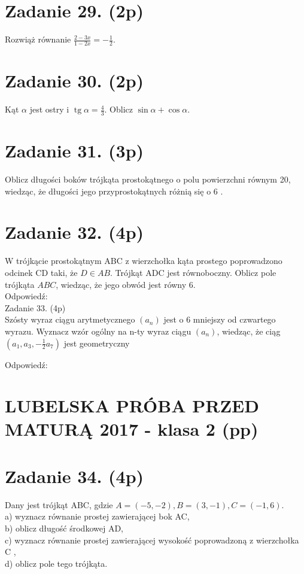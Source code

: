 \documentclass[10pt]{article}
\begin{document}
\section*{Zadanie 29. (2p)}
Rozwiąż równanie \(\frac{2-3 x}{1-2 x}=-\frac{1}{2}\).

\section*{Zadanie 30. (2p)}
Kąt \(\alpha\) jest ostry i \(\operatorname{tg} \alpha=\frac{4}{3}\). Oblicz \(\sin \alpha+\cos \alpha\).

\section*{Zadanie 31. (3p)}
Oblicz długości boków trójkąta prostokątnego o polu powierzchni równym 20, wiedząc, że długości jego przyprostokątnych różnią się o 6 .

\section*{Zadanie 32. (4p)}
W trójkącie prostokątnym ABC z wierzchołka kąta prostego poprowadzono odcinek CD taki, że \(D \in A B\). Trójkąt ADC jest równoboczny. Oblicz pole trójkąta \(A B C\), wiedząc, że jego obwód jest równy 6.\\
\(\qquad\)\\
Odpowiedź:\\
Zadanie 33. (4p)\\
Szósty wyraz ciągu arytmetycznego \(\left(a_{n}\right)\) jest o 6 mniejszy od czwartego wyrazu. Wyznacz wzór ogólny na n-ty wyraz ciągu \(\left(a_{n}\right)\), wiedząc, że ciąg \(\left(a_{1}, a_{3},-\frac{1}{2} a_{7}\right)\) jest geometryczny

Odpowiedź:

\section*{LUBELSKA PRÓBA PRZED MATURĄ 2017 - klasa 2 (pp)}
\section*{Zadanie 34. (4p)}
Dany jest trójkąt ABC, gdzie \(A=(-5,-2), B=(3,-1), C=(-1,6)\).\\
a) wyznacz równanie prostej zawierającej bok AC,\\
b) oblicz długość środkowej AD,\\
c) wyznacz równanie prostej zawierającej wysokość poprowadzoną z wierzchołka C ,\\
d) oblicz pole tego trójkąta.
\end{document}
